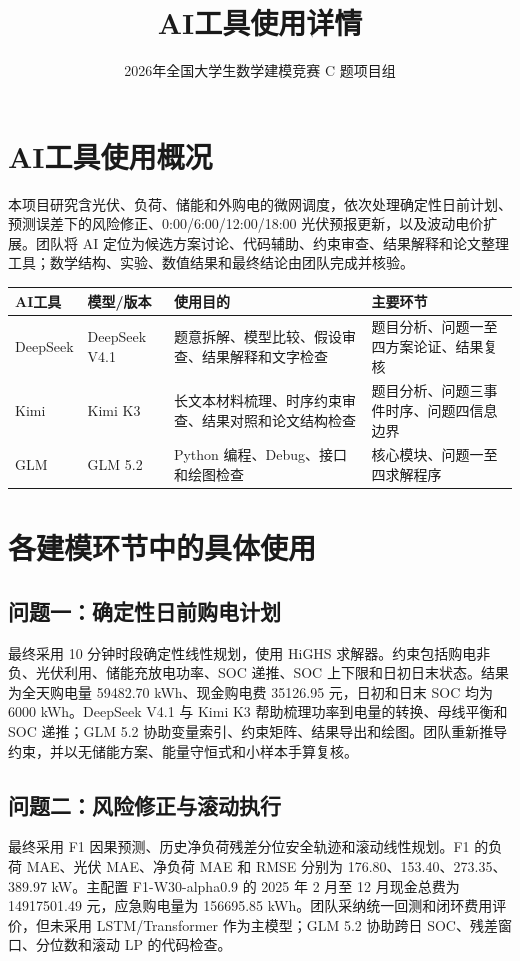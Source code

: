 \documentclass[UTF8,a4paper,11pt]{ctexart}
\title{AI工具使用详情}
\author{2026年全国大学生数学建模竞赛 C 题项目组}
\date{}
\begin{document}
\maketitle
\tableofcontents
\newpage
\section{AI工具使用概况}
本项目研究含光伏、负荷、储能和外购电的微网调度，依次处理确定性日前计划、预测误差下的风险修正、0:00/6:00/12:00/18:00 光伏预报更新，以及波动电价扩展。团队将 AI 定位为候选方案讨论、代码辅助、约束审查、结果解释和论文整理工具；数学结构、实验、数值结果和最终结论由团队完成并核验。
\begin{longtable}{p{}p{}p{}p{}}
\toprule AI工具 & 模型/版本 & 使用目的 & 主要环节\\\midrule
DeepSeek & DeepSeek V4.1 & 题意拆解、模型比较、假设审查、结果解释和文字检查 & 题目分析、问题一至四方案论证、结果复核\\
Kimi & Kimi K3 & 长文本材料梳理、时序约束审查、结果对照和论文结构检查 & 题目分析、问题三事件时序、问题四信息边界\\
GLM & GLM 5.2 & Python 编程、Debug、接口和绘图检查 & 核心模块、问题一至四求解程序\\
\bottomrule
\end{longtable}
\section{各建模环节中的具体使用}
\subsection{问题一：确定性日前购电计划}
最终采用 10 分钟时段确定性线性规划，使用 HiGHS 求解器。约束包括购电非负、光伏利用、储能充放电功率、SOC 递推、SOC 上下限和日初日末状态。结果为全天购电量 59482.70 kWh、现金购电费 35126.95 元，日初和日末 SOC 均为 6000 kWh。DeepSeek V4.1 与 Kimi K3 帮助梳理功率到电量的转换、母线平衡和 SOC 递推；GLM 5.2 协助变量索引、约束矩阵、结果导出和绘图。团队重新推导约束，并以无储能方案、能量守恒式和小样本手算复核。
\subsection{问题二：风险修正与滚动执行}
最终采用 F1 因果预测、历史净负荷残差分位安全轨迹和滚动线性规划。F1 的负荷 MAE、光伏 MAE、净负荷 MAE 和 RMSE 分别为 176.80、153.40、273.35、389.97 kW。主配置 F1-W30-alpha0.9 的 2025 年 2 月至 12 月现金总费为 14917501.49 元，应急购电量为 156695.85 kWh。团队采纳统一回测和闭环费用评价，但未采用 LSTM/Transformer 作为主模型；GLM 5.2 协助跨日 SOC、残差窗口、分位数和滚动 LP 的代码检查。
\end{document}
